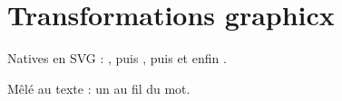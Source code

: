 \documentclass{article}
\begin{document}
\hsize=380pt
\section{Transformations graphicx}
Natives en SVG : , puis ,
puis  et enfin
.

M\^el\'e au texte : un \scalebox{1.4}{\textcolor{red}{grand rouge}} au fil du mot.
\end{document}
